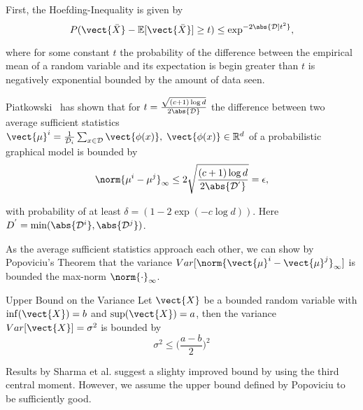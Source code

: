 First, the Hoefding-Inequality is given by
\begin{equation}
    P(\vect{\bar{X}} - \mathbb{E}[\vect{\bar{X}}] \geq t ) \leq \exp^{-2\abs{\mathcal{D}]t^2}},
\end{equation}

where for some constant $t$ the probability of the difference between the empirical mean of a random variable and its expectation is begin greater than $t$ is negatively exponential bounded by the amount of data seen.

Piatkowski~\cite{piatkowski2019distributed} has shown that for $t = \frac{\sqrt{(c+1) \log d}}{2\abs{\mathcal{D}}}$ the difference between two average sufficient statistics $\vect{\mu}^i = \frac{1}{\mathcal{D}_i} \sum_{x \in \mathcal{D}} \vect{\phi(x)}, \; \vect{\phi(x)} \in \mathbb{R}^d$ of a probabilistic graphical model is bounded by
\begin{equation}
    \label{eq:hoefd}
    \norm{\mu^{i} -  \mu^{j}}_\infty \leq 2 \sqrt{
        \frac{(c+1) \log d}
        {2\abs{\mathcal{D^{'}}}}
        } = \epsilon,
\end{equation}

with probability of at least $\delta= (1- 2 \exp(-c \log d))$. Here $D^{'} = \min(\abs{\mathcal{D}^i}, \abs{\mathcal{D}^j})$.

As the average sufficient statistics approach each other, we can show by Popoviciu's Theorem \cite{popoviciu1935equations} that the variance $Var[\norm{\vect{\mu}^{i} -  \vect{\mu}^{j}}_\infty]$ is bounded \wrt the max-norm $\norm{\cdot}_{\infty}$.
\begin{threm}{Upper Bound on the Variance}
    Let $\vect{X}$ be a bounded random variable with $\inf(\vect{X}) = b$ and $\sup(\vect{X}) = a$, 
    then the variance $Var[\vect{X}] = \sigma^2$ is bounded by 
    \begin{equation}
        \sigma^2 \leq \bigg(\frac{a-b}{2}\bigg)^{2}
    \end{equation}
\end{threm}

Results by Sharma et al. \cite{sharma2010betterbounds} suggest a slighty improved bound by using the third central moment.
However, we assume the upper bound defined by Popoviciu to be sufficiently good. 



